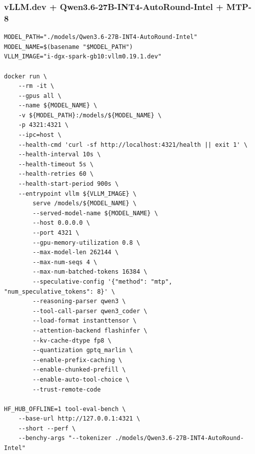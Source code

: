 \documentclass{article}
\begin{document}
\subsubsection{vLLM.dev + Qwen3.6-27B-INT4-AutoRound-Intel + MTP-8}
\begin{lstlisting}
MODEL_PATH="./models/Qwen3.6-27B-INT4-AutoRound-Intel"
MODEL_NAME=$(basename "$MODEL_PATH")
VLLM_IMAGE="i-dgx-spark-gb10:vllm0.19.1.dev"

docker run \
    --rm -it \
    --gpus all \
    --name ${MODEL_NAME} \
    -v ${MODEL_PATH}:/models/${MODEL_NAME} \
    -p 4321:4321 \
    --ipc=host \
    --health-cmd 'curl -sf http://localhost:4321/health || exit 1' \
    --health-interval 10s \
    --health-timeout 5s \
    --health-retries 60 \
    --health-start-period 900s \
    --entrypoint vllm ${VLLM_IMAGE} \
        serve /models/${MODEL_NAME} \
        --served-model-name ${MODEL_NAME} \
        --host 0.0.0.0 \
        --port 4321 \
        --gpu-memory-utilization 0.8 \
        --max-model-len 262144 \
        --max-num-seqs 4 \
        --max-num-batched-tokens 16384 \
        --speculative-config '{"method": "mtp", "num_speculative_tokens": 8}' \
        --reasoning-parser qwen3 \
        --tool-call-parser qwen3_coder \
        --load-format instanttensor \
        --attention-backend flashinfer \
        --kv-cache-dtype fp8 \
        --quantization gptq_marlin \
        --enable-prefix-caching \
        --enable-chunked-prefill \
        --enable-auto-tool-choice \
        --trust-remote-code

HF_HUB_OFFLINE=1 tool-eval-bench \
    --base-url http://127.0.0.1:4321 \
    --short --perf \
    --benchy-args "--tokenizer ./models/Qwen3.6-27B-INT4-AutoRound-Intel"
\end{lstlisting}
\end{document}

